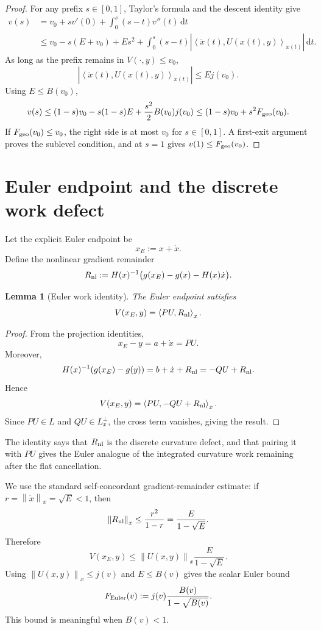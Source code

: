 \documentclass[11pt]{article}
\newtheorem{lemma}{Lemma}
\newcommand{\ip}[2]{\left\langle #1,#2\right\rangle}
\newcommand{\norm}[1]{\left\lVert #1\right\rVert}
\newcommand{\dd}{\mathrm d}
\begin{document}
\begin{proof}
For any prefix $s\in[0,1]$, Taylor's formula and the descent identity give
\[
\begin{aligned}
    v(s)
    &=v_0+s v'(0)+\int_0^s(s-t)v''(t)\,\dd t \\
    &\le v_0-s(E+v_0)+Es^2
    +\int_0^s(s-t)\left|\ip{\ddot x(t)}{U(x(t),y)}_{x(t)}\right|\,\dd t.
\end{aligned}
\]
As long as the prefix remains in $V(\cdot,y)\le v_0$,
\[
    \left|\ip{\ddot x(t)}{U(x(t),y)}_{x(t)}\right|
    \le E j(v_0).
\]
Using $E\le B(v_0)$,
\[
    v(s)
    \le
    (1-s)v_0-s(1-s)E+\frac{s^2}{2}B(v_0)j(v_0)
    \le
    (1-s)v_0+s^2 F_{\rm geo}(v_0).
\]
If $F_{\rm geo}(v_0)\le v_0$, the right side is at most $v_0$ for $s\in[0,1]$. A first-exit argument proves the sublevel condition, and at $s=1$ gives $v(1)\le F_{\rm geo}(v_0)$.
\end{proof}

\section{Euler endpoint and the discrete work defect}

Let the explicit Euler endpoint be
\[
    x_E:=x+\dot x.
\]
Define the nonlinear gradient remainder
\[
    R_{\rm nl}:=H(x)^{-1}\bigl(g(x_E)-g(x)-H(x)\dot x\bigr).
\]

\begin{lemma}[Euler work identity]
The Euler endpoint satisfies
\[
    V(x_E,y)=\ip{PU}{R_{\rm nl}}_x.
\]
\end{lemma}

\begin{proof}
From the projection identities,
\[
    x_E-y=a+\dot x=PU.
\]
Moreover,
\[
    H(x)^{-1}(g(x_E)-g(y))
    =b+\dot x+R_{\rm nl}
    =-QU+R_{\rm nl}.
\]
Hence
\[
    V(x_E,y)=\ip{PU}{-QU+R_{\rm nl}}_x.
\]
Since $PU\in L$ and $QU\in L_x^\perp$, the cross term vanishes, giving the result.
\end{proof}

The identity says that $R_{\rm nl}$ is the discrete curvature defect, and that pairing it with $PU$ gives the Euler analogue of the integrated curvature work remaining after the flat cancellation.

We use the standard self-concordant gradient-remainder estimate: if $r=\norm{\dot x}_x=\sqrt E<1$, then
\[
    \norm{R_{\rm nl}}_x
    \le
    \frac{r^2}{1-r}
    =
    \frac{E}{1-\sqrt E}.
\]
Therefore
\[
    V(x_E,y)
    \le
    \norm{U(x,y)}_x\frac{E}{1-\sqrt E}.
\]
Using $\norm{U(x,y)}_x\le j(v)$ and $E\le B(v)$ gives the scalar Euler bound
\[
    F_{\rm Euler}(v)
    :=
    j(v)\frac{B(v)}{1-\sqrt{B(v)}}.
\]
This bound is meaningful when $B(v)<1$.
\end{document}
